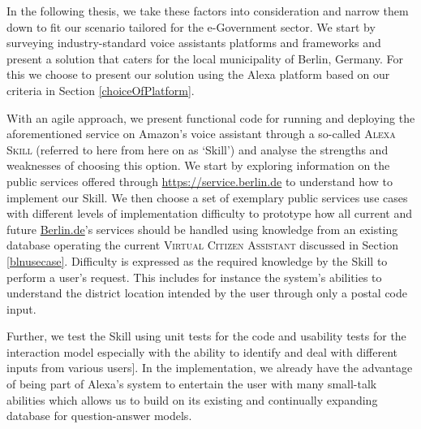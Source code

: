 In the following thesis, we take these factors into consideration and narrow them down to fit our scenario tailored for the e-Government sector. We start by surveying industry-standard %
voice assistants platforms 
and frameworks
and present a solution that caters for the local municipality of Berlin, Germany. For this we choose to present our solution using the Alexa platform based on our criteria in Section \ref{choiceOfPlatform}.

With an agile approach, we present functional code for running and deploying the aforementioned service on Amazon's voice assistant through a so-called \textsc{Alexa Skill} (referred to here from here on as `Skill') and analyse the strengths and weaknesses of choosing this option. We start by exploring information on the public services offered through \href{https://service.berlin.de}{https://service.berlin.de} 
to understand how to implement our Skill. 
We then choose a set of exemplary public services use cases with different levels of implementation difficulty to prototype how all current and future \href{https://service.berlin.de}{Berlin.de}'s 
services should be handled using knowledge from an existing database operating the current \textsc{Virtual Citizen Assistant} discussed in Section \ref{blnusecase}.
Difficulty is expressed as the required knowledge by the Skill to perform a user's request. This includes for instance the system's abilities to understand the district location intended by the user through only a postal code input.

Further, we test the Skill using unit tests  for the code and usability tests for the interaction model especially with the ability to identify and deal with different inputs from various users].
In the implementation, we already have the advantage of being part of Alexa's system to entertain the user with
many small-talk abilities 
which allows us to build on its existing and continually expanding database for question-answer models.


